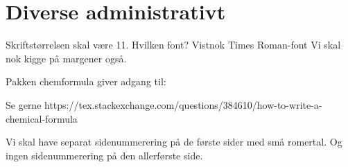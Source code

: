 \documentclass[a5paper,20pt]{book}
\begin{document}



\tableofcontents








\chapter{Diverse administrativt}
Skriftstørrelsen skal være 11.
Hvilken font? Vistnok Times Roman-font
Vi skal nok kigge på margener også.

Pakken chemformula giver adgang til:




Se gerne https://tex.stackexchange.com/questions/384610/how-to-write-a-chemical-formula

Vi skal have separat sidenummerering på de første sider med små romertal. Og ingen sidenummerering på den allerførste side.


\end{document}
